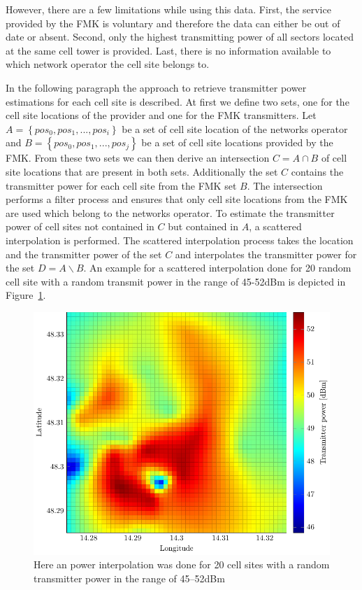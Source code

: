 However, there are a few limitations while using this data. First, the service provided by the FMK is voluntary and therefore the data can either be out of date or absent. Second, only the highest transmitting power of all sectors located at the same cell tower is provided. Last, there is no information available to which network operator the cell site belongs to.

In the following paragraph the approach to retrieve transmitter power estimations for each cell site is described. At first we define two sets, one for the cell site locations of the provider and one for the FMK transmitters.
Let $A=\left\lbrace pos_0,pos_1,...,pos_i \right\rbrace $ be a set of cell site location of the networks operator and $B=\left\lbrace pos_0,pos_1,...,pos_j \right\rbrace$ be a set of cell site locations provided by the FMK. From these two sets we can then derive an intersection $C=A \cap B$ of cell site locations that are present in both sets. Additionally the set $C$ contains the transmitter power for each cell site from the FMK set $B$. The intersection performs a filter process and ensures that only cell site locations from the FMK are used which belong to the networks operator. To estimate the transmitter power of cell sites not contained in $C$ but  contained in $A$, a scattered interpolation is performed. The scattered interpolation process takes the location and the transmitter power of the set $C$ and interpolates the transmitter power for the set $D=A \backslash B$.
An example for a scattered interpolation done for 20 random cell site with a random transmit power in the range of 45-52dBm is depicted in Figure~\ref{fig:transmitpower}.
	\begin{figure}[h!]
		\label{fig:transmitpower}
		\caption{
		Here an power interpolation was done for 20 cell sites with a random transmitter power in the range of 45--52dBm}
		\includegraphics[width=0.9\columnwidth]{senderpower}
	\end{figure}
